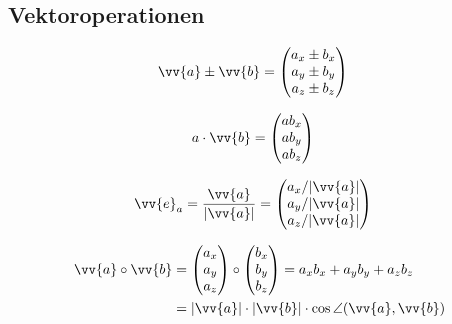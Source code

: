 \subsection{Vektoroperationen}

\begin{boxleft}
\end{boxleft}\begin{boxrightshaded}
\begin{align} 
\vv{a}\pm\vv{b}&= \begin{pmatrix}a_x\pm b_x\\a_y\pm b_y\\a_z\pm b_z\end{pmatrix}
\end{align}\end{boxrightshaded}

\begin{boxleft}
\end{boxleft}\begin{boxrightshaded}
\begin{align} 
a\cdot\vv{b}&= \begin{pmatrix}ab_x\\ ab_y\\ab_z\end{pmatrix}
\end{align}\end{boxrightshaded}

\begin{boxleft}
\end{boxleft}\begin{boxrightshaded}
\begin{align} 
\vv{e}_a&=\frac{\vv{a}}{|\vv{a}|}= \begin{pmatrix}a_x/|\vv{a}|\\ a_y/|\vv{a}|\\a_z/|\vv{a}|\end{pmatrix}
\end{align}\end{boxrightshaded}

\begin{boxleft}
\end{boxleft}\begin{boxrightshaded}
\begin{align} 
\vv{a}\circ\vv{b} &= \begin{pmatrix}a_x\\ a_y\\a_z\end{pmatrix}\circ\begin{pmatrix}b_x\\ b_y\\b_z\end{pmatrix}=a_xb_x+a_yb_y+a_zb_z\\
		  &=|\vv{a}|\cdot|\vv{b}|\cdot \cos\angle(\vv{a},\vv{b})
\end{align}\end{boxrightshaded}


